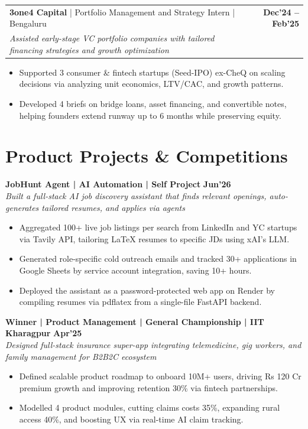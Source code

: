 \documentclass[10pt, a4paper]{article}
\makeatletter
\newcommand{\jobheader}[4]{
  \vspace{-1pt}
  \begin{tabular*}{\textwidth}[t]{l@{\extracolsep{\fill}}r}
    \textbf{#1} \quad | \quad #3 & \textbf{\small #4} \\
    \textit{\small #2} & \\
  \end{tabular*}
  \vspace{-2pt}
}
\newenvironment{achievelist}{
  \begin{itemize}[leftmargin=1.2em, itemsep=0.5pt, parsep=0pt, topsep=1pt]
    \small
}{
  \end{itemize}
  \vspace{-2pt}
}
\newcommand{\achieve}[1]{\item #1}
\makeatother
\begin{document}
\jobheader{3one4 Capital}{Assisted early-stage VC portfolio companies with tailored financing strategies and growth optimization}{Portfolio Management and Strategy Intern | Bengaluru}{Dec'24 -- Feb'25}
\begin{achievelist}
  \achieve{Supported 3 consumer \& fintech startups (Seed-IPO) ex-CheQ on scaling decisions via analyzing unit economics, LTV/CAC, and growth patterns.}
  \achieve{Developed 4 briefs on bridge loans, asset financing, and convertible notes, helping founders extend runway up to 6 months while preserving equity.}
\end{achievelist}

\vspace{-2pt}

\section{Product Projects \& Competitions}

\textbf{JobHunt Agent | AI Automation | Self Project} \hfill \textbf{\small Jun'26} \\
\textit{\small Built a full-stack AI job discovery assistant that finds relevant openings, auto-generates tailored resumes, and applies via agents}
\begin{achievelist}
  \achieve{Aggregated 100+ live job listings per search from LinkedIn and YC startups via Tavily API, tailoring LaTeX resumes to specific JDs using xAI's LLM.}
  \achieve{Generated role-specific cold outreach emails and tracked 30+ applications in Google Sheets by service account integration, saving 10+ hours.}
  \achieve{Deployed the assistant as a password-protected web app on Render by compiling resumes via pdflatex from a single-file FastAPI backend.}
\end{achievelist}

\textbf{Winner | Product Management | General Championship | IIT Kharagpur} \hfill \textbf{\small Apr'25} \\
\textit{\small Designed full-stack insurance super-app integrating telemedicine, gig workers, and family management for B2B2C ecosystem}
\begin{achievelist}
  \achieve{Defined scalable product roadmap to onboard 10M+ users, driving Rs 120 Cr premium growth and improving retention 30\% via fintech partnerships.}
  \achieve{Modelled 4 product modules, cutting claims costs 35\%, expanding rural access 40\%, and boosting UX via real-time AI claim tracking.}
\end{achievelist}
\end{document}
